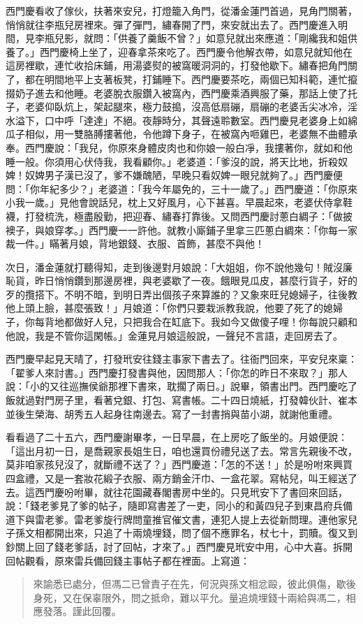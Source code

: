 西門慶看收了傢伙，扶著來安兒，打燈籠入角門，從潘金蓮門首過，見角門關著，悄悄就往李瓶兒房裡來。彈了彈門，繡春開了門，來安就出去了。西門慶進入明間，見李瓶兒影，就問：「供養了羹飯不曾？」如意兒就出來應道：「剛纔我和姐供養了。」西門慶椅上坐了，迎春拿茶來吃了。西門慶令他解衣帶，如意兒就知他在這房裡歇，連忙收拾床鋪，用湯婆熨的被窩暖洞洞的，打發他歇下。繡春把角門關了，都在明間地平上支著板凳，打鋪睡下。西門慶要茶吃，兩個已知科範，連忙攛掇奶子進去和他睡。老婆脫衣服鑽入被窩內，西門慶乘酒興服了藥，那話上使了托子，老婆仰臥炕上，架起腿來，極力鼓搗，沒高低扇磞，扇磞的老婆舌尖冰冷，淫水溢下，口中呼「達達」不絕。夜靜時分，其聲遠聆數室。西門慶見老婆身上如綿瓜子相似，用一雙胳膊摟著他，令他蹲下身子，在被窩內咂雞巴，老婆無不曲體承奉。西門慶說：「我兒，你原來身體皮肉也和你娘一般白凈，我摟著你，就如和他睡一般。你須用心伏侍我，我看顧你。」老婆道：「爹沒的說，將天比地，折殺奴婢！奴婢男子漢已沒了，爹不嫌醜陋，早晚只看奴婢一眼兒就夠了。」西門慶便問：「你年紀多少？」老婆道：「我今年屬免的，三十一歲了。」西門慶道：「你原來小我一歲。」見他會說話兒，枕上又好風月，心下甚喜。早晨起來，老婆伏侍拿鞋襪，打發梳洗，極盡殷勤，把迎春、繡春打靠後。又問西門慶討蔥白綢子：「做披襖子，與娘穿孝。」西門慶一一許他。就教小廝鋪子里拿三匹蔥白綢來：「你每一家裁一件。」瞞著月娘，背地銀錢、衣服、首飾，甚麼不與他！

次日，潘金蓮就打聽得知，走到後邊對月娘說：「大姐姐，你不說他幾句！賊沒廉恥貨，昨日悄悄鑽到那邊房裡，與老婆歇了一夜。餓眼見瓜皮，甚麼行貨子，好的歹的攬搭下。不明不暗，到明日弄出個孩子來算誰的？又象來旺兒媳婦子，往後教他上頭上臉，甚麼張致！」月娘道：「你們只要栽派教我說，他要了死了的媳婦子，你每背地都做好人兒，只把我合在缸底下。我如今又做傻子哩！你每說只顧和他說，我是不管你這閑帳。」金蓮見月娘這般說，一聲兒不言語，走回房去了。

西門慶早起見天晴了，打發玳安往錢主事家下書去了。往衙門回來，平安兒來稟：「翟爹人來討書。」西門慶打發書與他，因問那人：「你怎的昨日不來取？」那人說：「小的又往巡撫侯爺那裡下書來，耽擱了兩日。」說畢，領書出門。西門慶吃了飯就過對門房子里，看著兌銀、打包、寫書帳。二十四日燒紙，打發韓伙計、崔本並後生榮海、胡秀五人起身往南邊去。寫了一封書捎與苗小湖，就謝他重禮。

看看過了二十五六，西門慶謝畢孝，一日早晨，在上房吃了飯坐的。月娘便說：「這出月初一日，是喬親家長姐生日，咱也還買份禮兒送了去。常言先親後不改，莫非咱家孩兒沒了，就斷禮不送了？」西門慶道：「怎的不送！」於是吩咐來興買四盒禮，又是一套妝花緞子衣服、兩方銷金汗巾、一盒花翠。寫帖兒，叫王經送了去。這西門慶吩咐畢，就往花園藏春閣書房中坐的。只見玳安下了書回來回話，說：「錢老爹見了爹的帖子，隨即寫書差了一吏，同小的和黃四兒子到東昌府兵備道下與雷老爹。雷老爹旋行牌問童推官催文書，連犯人提上去從新問理。連他家兒子孫文相都開出來，只追了十兩燒埋錢，問了個不應罪名，杖七十，罰贖。復又到鈔關上回了錢老爹話，討了回帖，才來了。」西門慶見玳安中用，心中大喜。拆開回帖觀看，原來雷兵備回錢主事帖子都在裡面。上寫道：
\begin{quote}
來諭悉已處分，但馮二已曾責子在先，何況與孫文相忿毆，彼此俱傷，歇後身死，又在保辜限外，問之抵命，難以平允。量追燒埋錢十兩給與馮二，相應發落。謹此回覆。
\end{quote}

